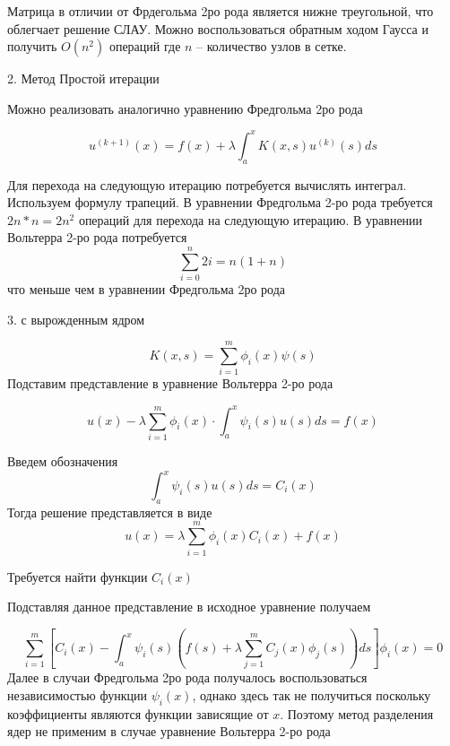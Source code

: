 \documentclass{article}
\begin{document}
\begin{enumerate}
	
	Матрица в отличии от Фрдегольма 2ро рода является нижне треугольной, что облегчает решение СЛАУ. Можно воспользоваться обратным ходом Гаусса и получить $O(n^2)$ операций где $n$ -- количество узлов в сетке.
	
	
	2. Метод Простой итерации
	
	 
	Можно реализовать аналогично уравнению Фредгольма 2ро рода 
	
	
	\[
	u^{(k+1)}(x) = f(x) + \lambda \int_{a}^{x}K(x,s) u^{(k)}(s)ds
	\]
	
	Для перехода на следующую итерацию потребуется вычислять интеграл. Используем формулу трапеций. В уравнении Фредгольма 2-ро рода требуется $2n*n = 2n^2$ операций для перехода на следующую итерацию. В уравнении Вольтерра 2-ро рода потребуется 
	\[
	\sum_{i=0}^{n}2i = n(1 + n)
	\]
	что меньше чем в уравнении Фредгольма 2ро рода
	
	
	3. с вырожденным ядром
	
	
	\[
	K(x,s) = \sum_{i=1}^{m} \phi_i(x) \psi(s)
	\]
	Подставим представление в уравнение Вольтерра 2-ро рода
	
	\[
	u(x) - \lambda \sum_{i=1}^{m} \phi_i(x) \cdot \int_{a}^{x} \psi_i(s) u(s)ds = f(x)
	\]
	
	Введем обозначения
	\[
	\int_{a}^{x} \psi_i(s) u(s)ds = C_i(x)
	\]
	Тогда решение представляется в виде
	\[
	u(x) =  \lambda \sum_{i=1}^{m} \phi_i(x)C_i(x) +f(x)
	\]
	
	Требуется найти функции $C_i(x)$
	
	
	Подставляя данное представление в исходное уравнение получаем
	
	\[
	\sum_{i=1}^{m}[C_i(x) - \int_{a}^{x} \psi_i(s)(f(s) + \lambda \sum_{j=1}^{m}C_j(x)\phi_j(s))ds] \phi_i(x) =0
	\]
	Далее в случаи Фредгольма 2ро рода получалось воспользоваться независимостью функции $\psi_i(x)$, однако здесь так не получиться поскольку коэффициенты являются функции зависящие от $x$. Поэтому метод разделения ядер не применим в случае уравнение Вольтерра 2-ро рода


\end{enumerate}
\end{document}
